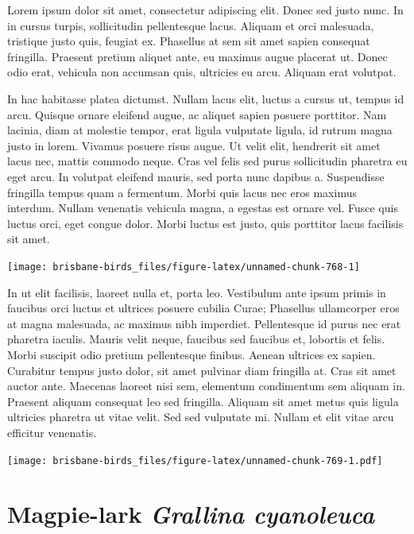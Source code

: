 \documentclass[]{book}
\let\origfigure\figure
\let\endorigfigure\endfigure
\renewenvironment{figure}[1][2] {
  \expandafter\origfigure\expandafter[H]
} {
  \endorigfigure
}
\begin{document}
Lorem ipsum dolor sit amet, consectetur adipiscing elit. Donec sed justo
nunc. In in cursus turpis, sollicitudin pellentesque lacus. Aliquam et
orci malesuada, tristique justo quis, feugiat ex. Phasellus at sem sit
amet sapien consequat fringilla. Praesent pretium aliquet ante, eu
maximus augue placerat ut. Donec odio erat, vehicula non accumsan quis,
ultricies eu arcu. Aliquam erat volutpat.

In hac habitasse platea dictumst. Nullam lacus elit, luctus a cursus ut,
tempus id arcu. Quisque ornare eleifend augue, ac aliquet sapien posuere
porttitor. Nam lacinia, diam at molestie tempor, erat ligula vulputate
ligula, id rutrum magna justo in lorem. Vivamus posuere risus augue. Ut
velit elit, hendrerit sit amet lacus nec, mattis commodo neque. Cras vel
felis sed purus sollicitudin pharetra eu eget arcu. In volutpat eleifend
mauris, sed porta nunc dapibus a. Suspendisse fringilla tempus quam a
fermentum. Morbi quis lacus nec eros maximus interdum. Nullam venenatis
vehicula magna, a egestas est ornare vel. Fusce quis luctus orci, eget
congue dolor. Morbi luctus est justo, quis porttitor lacus facilisis sit
amet.

\begin{figure}
\texttt{[image: brisbane-birds\_files/figure-latex/unnamed-chunk-768-1]} \caption{insert figure caption}\label{fig:unnamed-chunk-768}
\end{figure}

In ut elit facilisis, laoreet nulla et, porta leo. Vestibulum ante ipsum
primis in faucibus orci luctus et ultrices posuere cubilia Curae;
Phasellus ullamcorper eros at magna malesuada, ac maximus nibh
imperdiet. Pellentesque id purus nec erat pharetra iaculis. Mauris velit
neque, faucibus sed faucibus et, lobortis et felis. Morbi suscipit odio
pretium pellentesque finibus. Aenean ultrices ex sapien. Curabitur
tempus justo dolor, sit amet pulvinar diam fringilla at. Cras sit amet
auctor ante. Maecenas laoreet nisi sem, elementum condimentum sem
aliquam in. Praesent aliquam consequat leo sed fringilla. Aliquam sit
amet metus quis ligula ultricies pharetra ut vitae velit. Sed sed
vulputate mi. Nullam et elit vitae arcu efficitur venenatis.

\begin{figure}
\centering
\texttt{[image: brisbane-birds\_files/figure-latex/unnamed-chunk-769-1.pdf]}
\caption{\label{fig:unnamed-chunk-769}insert figure caption}
\end{figure}

\section{\texorpdfstring{Magpie-lark \emph{Grallina
cyanoleuca}}{Magpie-lark Grallina cyanoleuca}}\label{magpie-lark-grallina-cyanoleuca}
\end{document}
